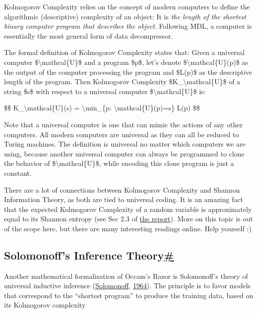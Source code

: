 Kolmogorov Complexity relies on the concept of modern computers to define the algorithmic (descriptive) complexity of an object: It is \emph{the length of the shortest binary computer program that describes the object}. Following MDL, a computer is essentially the most general form of data decompressor.

The formal definition of Kolmogorov Complexity states that: Given a universal computer \$\textbackslash mathcal\{U\}\$ and a program \$p\$, let's denote \$\textbackslash mathcal\{U\}(p)\$ as the output of the computer processing the program and \$L(p)\$ as the descriptive length of the program. Then Kolmogorov Complexity \$K\_\textbackslash mathcal\{U\}\$ of a string \$s\$ with respect to a universal computer \$\textbackslash mathcal\{U\}\$ is:

\$\$ K\_\textbackslash mathcal\{U\}(s) = \textbackslash min\_\{p: \textbackslash mathcal\{U\}(p)=s\} L(p) \$\$

Note that a universal computer is one that can mimic the actions of any other computers. All modern computers are universal as they can all be reduced to Turing machines. The definition is universal no matter which computers we are using, because another universal computer can always be programmed to clone the behavior of \$\textbackslash mathcal\{U\}\$, while encoding this clone program is just a constant.

There are a lot of connections between Kolmogorov Complexity and Shannon Information Theory, as both are tied to universal coding. It is an amazing fact that the expected Kolmogorov Complexity of a random variable is approximately equal to its Shannon entropy (see Sec 2.3 of \href{https://homepages.cwi.nl/~paulv/papers/info.pdf}{the report}). More on this topic is out of the scope here, but there are many interesting readings online. Help yourself :)

\subsection{\texorpdfstring{Solomonoff's Inference Theory\hyperref[solomonoffs-inference-theory]{\#}}{Solomonoff's Inference Theory\#}}\label{solomonoffs-inference-theory}

Another mathematical formalization of Occam's Razor is Solomonoff's theory of universal inductive inference (\href{https://www.sciencedirect.com/science/article/pii/S0019995864902232}{Solomonoff}, \href{https://www.sciencedirect.com/science/article/pii/S0019995864901317}{1964}). The principle is to favor models that correspond to the ``shortest program'' to produce the training data, based on its Kolmogorov complexity

